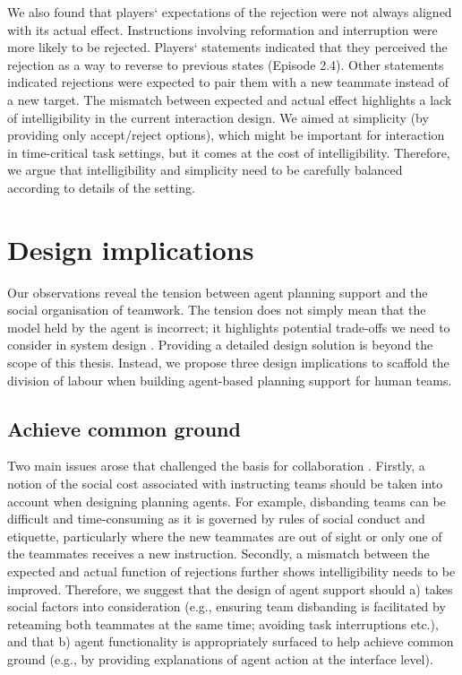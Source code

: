 We also found that players` expectations of the rejection were not always aligned with its actual effect. Instructions involving reformation and interruption were more likely to be rejected. Players` statements indicated that they perceived the rejection as a way to reverse to previous states (Episode 2.4). Other statements indicated rejections were expected to pair them with a new teammate instead of a new target. The mismatch between expected and actual effect highlights a lack of intelligibility in the current interaction design. We aimed at simplicity (by providing only accept/reject options), which might be important for interaction in time-critical task settings, but it comes at the cost of intelligibility. Therefore, we argue that intelligibility and simplicity need to be carefully balanced according to details of the setting.\\


\section{Design implications}

Our observations reveal the tension between agent planning support and the social organisation of teamwork. The tension does not simply mean that the model held by the agent is incorrect; it highlights potential trade-offs we need to consider in system design \cite{Bowers1994,Sukthankar}. Providing a detailed design solution is beyond the scope of this thesis. Instead, we propose three design implications to scaffold the division of labour when building agent-based planning support for human teams.\\

\subsection{Achieve common ground}  
Two main issues arose that challenged the basis for collaboration \cite{Bradshaw2011}. Firstly, a notion of the social cost associated with instructing teams should be taken into account when designing planning agents. For example, disbanding teams can be difficult and time-consuming as it is governed by rules of social conduct and etiquette, particularly where the new teammates are out of sight or only one of the teammates receives a new instruction. Secondly, a mismatch between the expected and actual function of rejections further shows intelligibility needs to be improved. Therefore, we suggest that the design of agent support should a) takes social factors into consideration (e.g., ensuring team disbanding is facilitated by reteaming both teammates at the same time; avoiding task interruptions etc.), and that b) agent functionality is appropriately surfaced to help achieve common ground (e.g., by providing explanations of agent action at the interface level).

